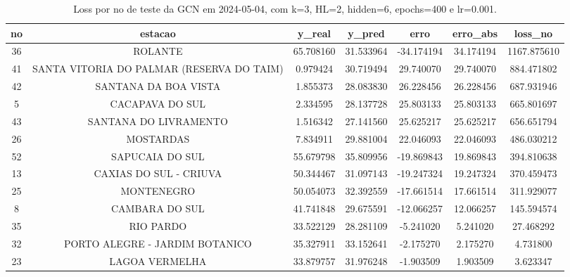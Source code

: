 \begin{table}[h]
\centering
\caption{Loss por no de teste da GCN em 2024-05-04, com k=3, HL=2, hidden=6, epochs=400 e lr=0.001.}
\label{tab:gcn_loss_k3_hl2_h6_e400_d20240504}
\begin{tabular}{ccccccc}
\toprule
no & estacao & y\_real & y\_pred & erro & erro\_abs & loss\_no \\
\midrule
36 & ROLANTE & 65.708160 & 31.533964 & -34.174194 & 34.174194 & 1167.875610 \\
41 & SANTA VITORIA DO PALMAR (RESERVA DO TAIM) & 0.979424 & 30.719494 & 29.740070 & 29.740070 & 884.471802 \\
42 & SANTANA DA BOA VISTA & 1.855373 & 28.083830 & 26.228456 & 26.228456 & 687.931946 \\
5 & CACAPAVA DO SUL & 2.334595 & 28.137728 & 25.803133 & 25.803133 & 665.801697 \\
43 & SANTANA DO LIVRAMENTO & 1.516342 & 27.141560 & 25.625217 & 25.625217 & 656.651794 \\
26 & MOSTARDAS & 7.834911 & 29.881004 & 22.046093 & 22.046093 & 486.030212 \\
52 & SAPUCAIA DO SUL & 55.679798 & 35.809956 & -19.869843 & 19.869843 & 394.810638 \\
13 & CAXIAS DO SUL - CRIUVA & 50.344467 & 31.097143 & -19.247324 & 19.247324 & 370.459473 \\
25 & MONTENEGRO & 50.054073 & 32.392559 & -17.661514 & 17.661514 & 311.929077 \\
8 & CAMBARA DO SUL & 41.741848 & 29.675591 & -12.066257 & 12.066257 & 145.594574 \\
35 & RIO PARDO & 33.522129 & 28.281109 & -5.241020 & 5.241020 & 27.468292 \\
32 & PORTO ALEGRE - JARDIM BOTANICO & 35.327911 & 33.152641 & -2.175270 & 2.175270 & 4.731800 \\
23 & LAGOA VERMELHA & 33.879757 & 31.976248 & -1.903509 & 1.903509 & 3.623347 \\
\bottomrule
\end{tabular}
\end{table}

